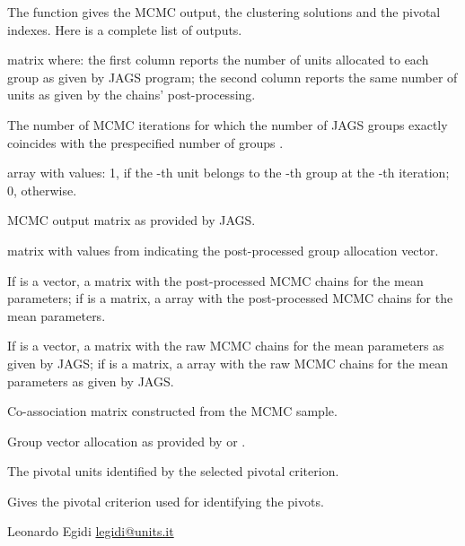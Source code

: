 \documentclass[a4paper]{book}
\begin{document}
\begin{Value}
The function gives the MCMC output, the clustering solutions and the pivotal indexes. Here is a complete list of outputs.

\begin{ldescription}
\item[\code{\code{Freq}}]    matrix where: the first column
reports the number of units allocated to each group
as given by JAGS program; the second
column reports the same number of units as given by the
chains' post-processing.
\item[\code{\code{true.iter}}]  The number of MCMC iterations for which
the number of JAGS groups exactly coincides with the prespecified
number of groups .
\item[\code{\code{z} }]    array with values: 1,
if the -th unit belongs to the -th group at
the -th iteration; 0, otherwise.
\item[\code{\code{ris}}]   MCMC output matrix as provided by JAGS.
\item[\code{\code{groupPost}}]   matrix
with values from  indicating the post-processed group allocation
vector.
\item[\code{ \code{mu\_switch}}]   If  is a vector, a 
matrix with the post-processed MCMC chains for the mean parameters; if
 is a matrix, a  array with
the post-processed MCMC chains for the mean parameters.
\item[\code{\code{mu\_raw}}]  If  is a vector, a  matrix
with the raw MCMC chains for the mean parameters as given by JAGS; if
 is a matrix, a  array with the raw MCMC chains
for the mean parameters as given by JAGS.
\item[\code{\code{C}}] Co-association matrix constructed from the MCMC sample.
\item[\code{\code{grr}}] Group vector allocation as provided by
 or .
\item[\code{\code{pivots}}]  The pivotal units identified by the
selected pivotal criterion.
\item[\code{\code{piv.criterion}}]  Gives the pivotal criterion used for identifying
the pivots.
\end{ldescription}
\end{Value}
%
\begin{Author}\relax
Leonardo Egidi \url{legidi@units.it}
\end{Author}
\end{document}
